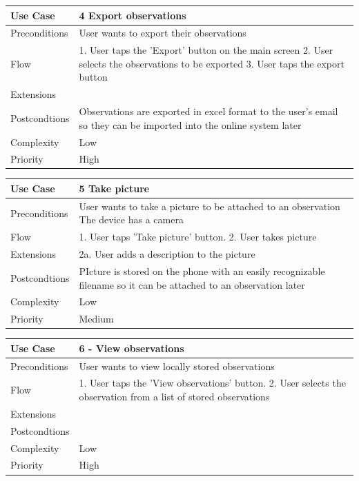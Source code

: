 \hspace{2em}

\begin{tabular}[t]{|l|p{}|}\hline
Use Case&4  Export  observations\\\hline
Preconditions& User wants to export their observations \\\hline
Flow&1. User taps the 'Export' button on the main screen
2. User selects the observations to be exported
3. User taps the export button\\\hline
Extensions& \\\hline
Postcondtions&Observations are exported in excel format to the user's email so they can be imported into the online system later\\\hline
Complexity&Low\\\hline
Priority&High\\\hline
\end{tabular}

\hspace{2em}

\begin{tabular}[t]{|l|p{}|}\hline
Use Case&5 Take picture\\\hline
Preconditions&User wants to take a picture to be attached to an observation
The device has a camera\\\hline
Flow&1. User taps 'Take picture' button.
2. User takes picture \\\hline
Extensions& 2a. User adds a description to the picture\\\hline
Postcondtions&PIcture is stored on the phone with an easily recognizable filename so it can be attached to an observation later\\\hline
Complexity&Low\\\hline
Priority&Medium\\\hline
\end{tabular}

\hspace{2em}

\begin{tabular}[t]{|l|p{}|}\hline
Use Case&6 - View observations\\\hline
Preconditions&User wants to view locally stored observations\\\hline
Flow&1. User taps the 'View observations' button.
2. User selects the observation from a list of stored observations \\\hline
Extensions& \\\hline
Postcondtions&\\\hline
Complexity&Low\\\hline
Priority&High\\\hline
\end{tabular}
